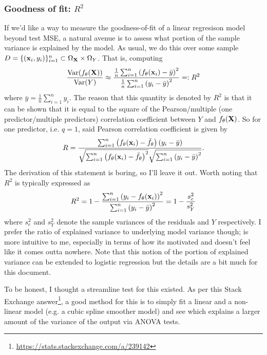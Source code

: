 \documentclass[11pt]{article}
\begin{document}
\subsubsection{Goodness of fit: $R^2$}
If we'd like a way to measure the goodness-of-fit of a linear regresison model beyond test MSE, a natural avenue is to assess what portion of the sample variance is explained by the model. As usual, we do this over some sample $D=\{(\mathbf{x}_i,y_i)\}_{i=1}^n\subset\Omega_{\mathbf{X}}\times\Omega_{Y}$. That is, computing
$$
\frac{\text{Var}(f_{\theta}(\mathbf{X}))}{\text{Var}(Y)}
\approx
\frac{\frac{1}{n}\sum_{i=1}^n\left(f_{\theta}(\mathbf{x}_i)-\bar{y}\right)^2}{\frac{1}{n}\sum_{i=1}^n\left(y_i-\bar{y}\right)^2}
=:
R^2
$$
where $\bar{y}=\frac{1}{n}\sum_{i=1}^ny_i$. The reason that this quantity is denoted by $R^2$ is that it can be shown that it is equal to the square of the Pearson/multiple (one predictor/multiple predictors) correlation coefficient between $Y$ and $f_{\theta}(\mathbf{X})$. So for one predictor, i.e. $q=1$, said Pearson correlation coefficient is given by
$$
R
=
\frac{\sum_{i=1}^n\left(f_{\theta}(\mathbf{x}_i)-\bar{f}_{\theta}\right)(y_i-\bar{y})}{\sqrt{\sum_{i=1}^n\left(f_{\theta}(\mathbf{x}_i)-\bar{f}_{\theta}\right)^2}\sqrt{\sum_{i=1}^n\left(y_i-\bar{y}\right)^2}}.
$$
The derivation of this statement is boring, so I'll leave it out. Worth noting that $R^2$ is typically expressed as
$$
R^2
=
1-\frac{\sum_{i=1}^n\left(y_i-f_{\theta}(\mathbf{x}_i)\right)^2}{\sum_{i=1}^n\left(y_i-\bar{y}\right)^2}
=
1-\frac{s_e^2}{s_Y^2}
$$
where $s_e^2$ and $s_Y^2$ denote the sample variances of the residuals and $Y$ respectively. I prefer the ratio of explained variance to underlying model variance though; is more intuitive to me, especially in terms of how its motivated and doesn't feel like it comes outta nowhere. Note that this notion of the portion of explained variance can be extended to logistic regression but the details are a bit much for this document.

\begin{tcolorbox}[title={\centering\textbf{How can we get an idea of the extent to which our features and output are linearly related without plotting?}}, colback=myLightBlue, colbacktitle=myDarkBlue, colframe=myDarkBlue, coltitle=white]
    To be honest, I thought a streamline test for this existed. As per this Stack Exchange answer\footnote{\url{https://stats.stackexchange.com/a/239142}}, a good method for this is to simply fit a linear and a non-linear model (e.g. a cubic spline smoother model) and see which explains a larger amount of the variance of the output via ANOVA tests.
\end{tcolorbox}
\end{document}
